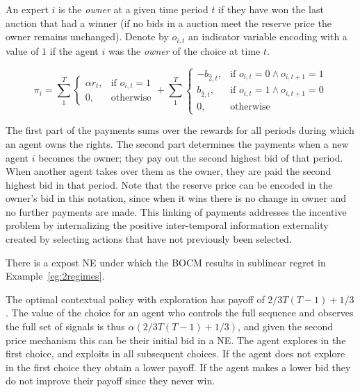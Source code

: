 \begin{mech}
An expert $i$ is the \emph{owner} at a given time period $t$ if they have won the last auction that had a winner (if no bids in a auction meet the reserve price the owner remains unchanged). 
Denote by $o_{i,t}$ an indicator variable encoding with a value of $1$ if the agent $i$ was the \emph{owner} of the choice at time $t$. 

\[
    \pi_i =  \sum_1^T
\begin{cases}
    \alpha r_t ,& \text{if } o_{i,t} = 1\\
    0,              & \text{otherwise}
\end{cases}
+
\sum_1^T
\begin{cases}
     - b_{\hat{2},t} ,& \text{if } o_{i,t} = 0 \land o_{i,t+1} = 1\\
      b_{\hat{2},t} ,& \text{if } o_{i,t}= 1 \land o_{i,t+1} = 0 \\
		0,              & \text{otherwise}
\end{cases}
\]

\end{mech}


The first part of the payments sums over the rewards for all periods during which an agent owns the rights.
The second part determines the payments when a new agent $i$ becomes the owner; they pay out the second highest bid of that period. 
When another agent takes over them as the owner, they are paid the second highest bid in that period.
Note that the reserve price can be encoded in the owner's bid in this notation, since when it wins there is no change in owner and no further payments are made. 
This linking of payments addresses the incentive problem by internalizing the positive inter-temporal information externality created by selecting actions that have not previously been selected.


\begin{prop}
There is a expost NE under which the BOCM  results in sublinear regret in Example~\ref{eg:2regimes}. 
\end{prop}


The optimal contextual policy with exploration has payoff of $2/3T(T-1) + 1/3$. The value of the choice for an agent who controls the full sequence and observes the full set of signals is thus $\alpha (2/3T(T-1) + 1/3)$, and given the second price mechanism this can be their initial bid in a NE. The agent explores in the first choice, and exploits in all subsequent choices. If the agent does not explore in the first choice they obtain a lower payoff. If the agent makes a lower bid they do not improve their payoff since they never win.


